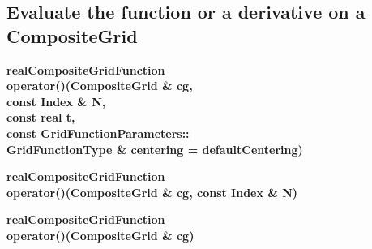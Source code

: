 \subsection{Evaluate the function or a derivative on a CompositeGrid}
 
\begin{flushleft} \textbf{%
realCompositeGridFunction  \\ 
\settowidth{\OGFunctionIncludeArgIndent}{operator()(}%
operator()(CompositeGrid \& cg, \\ 
\hspace{\OGFunctionIncludeArgIndent}const Index \& N, \\ 
\hspace{\OGFunctionIncludeArgIndent}const real t,\\ 
\hspace{\OGFunctionIncludeArgIndent}const GridFunctionParameters::\\ 
\hspace{\OGFunctionIncludeArgIndent}GridFunctionType \& centering   = defaultCentering)
}\end{flushleft}

 
\begin{flushleft} \textbf{%
realCompositeGridFunction  \\ 
\settowidth{\OGFunctionIncludeArgIndent}{operator()(}%
operator()(CompositeGrid \& cg, const Index \& N)
}\end{flushleft}

 
\begin{flushleft} \textbf{%
realCompositeGridFunction  \\ 
\settowidth{\OGFunctionIncludeArgIndent}{operator()(}%
operator()(CompositeGrid \& cg)
}\end{flushleft}


